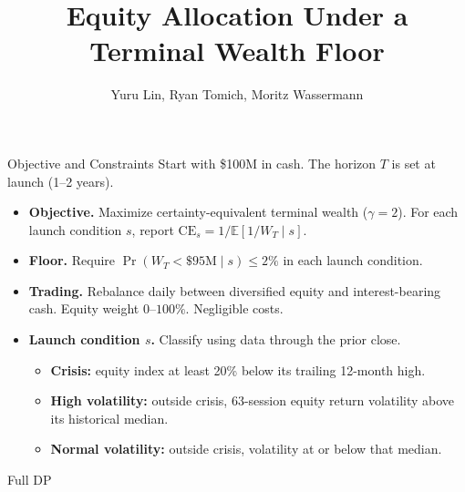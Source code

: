 \documentclass[aspectratio=169]{beamer}
\title{Equity Allocation Under a Terminal Wealth Floor}
\author{Yuru Lin, Ryan Tomich, Moritz Wassermann}
\date{}
\begin{document}
\begin{frame}[plain]
  \titlepage
\end{frame}

\begin{frame}{Objective and Constraints}
    Start with \$100M in cash. The horizon \(T\) is set at launch (1--2 years).

    \medskip
    \begin{itemize}
        \setlength{\itemsep}{0.8em}
        \item \textbf{Objective.} Maximize certainty-equivalent terminal wealth
            (\(\gamma=2\)). For each launch condition \(s\), report
            \(\mathrm{CE}_s=1/\mathbb{E}[1/W_T\mid s]\).
        \item \textbf{Floor.} Require \(\Pr(W_T<\$95\mathrm{M}\mid s)\le 2\%\)
            in each launch condition.
        \item \textbf{Trading.} Rebalance daily between diversified equity and
            interest-bearing cash. Equity weight \(0\)--\(100\%\). Negligible costs.
        \item \textbf{Launch condition \(s\).} Classify using data through the prior close.
            \begin{itemize}
                \item \textbf{Crisis:} equity index at least 20\% below its trailing 12-month high.
                \item \textbf{High volatility:} outside crisis, 63-session equity return volatility
                    above its historical median.
                \item \textbf{Normal volatility:} outside crisis, volatility at or below that median.
            \end{itemize}
    \end{itemize}
\end{frame}

\begin{frame}{Full DP}
    
\end{frame}
\end{document}

